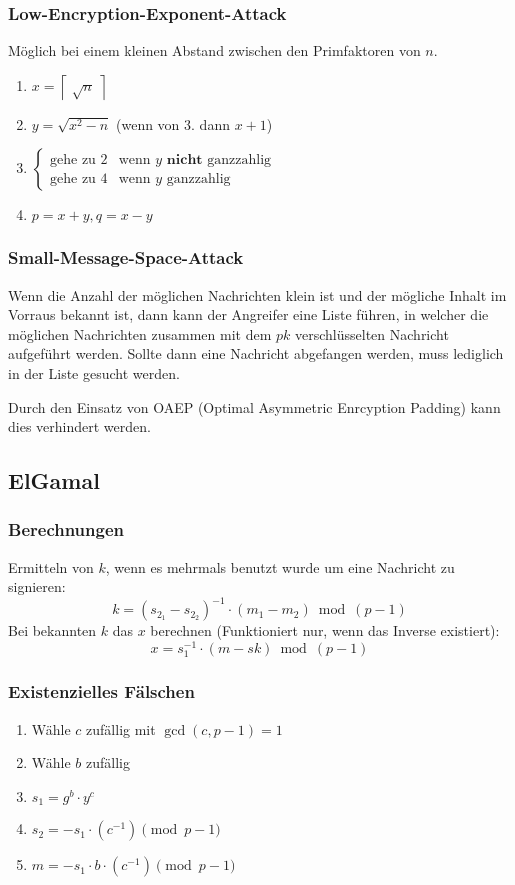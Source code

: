 \documentclass[a4paper,landscape]{article}
\newcommand{\plaint}{\ensuremath{m}}
\newcommand{\skey}{\ensuremath{sk}}
\newcommand{\pkey}{\ensuremath{pk}}
\begin{document}
\begin{multicols*}{4}
	\subsubsection*{Low-Encryption-Exponent-Attack}
	Möglich bei einem kleinen Abstand zwischen den Primfaktoren von \(n\).
	\begin{enumerate}
		\item \(x = \left\lceil\;\sqrt{n}\;\right\rceil\)
		\item \(y = \sqrt{x^{2}-n}\) (wenn von 3. dann \(x+1\))
		\item \(
		      \begin{cases}
			      \text{gehe zu 2} & \text{wenn } y \textbf{ nicht}\text{ ganzzahlig} \\
			      \text{gehe zu 4} & \text{wenn } y \text{ ganzzahlig}
		      \end{cases}\)
		\item \(p = x+y, q = x-y\)
	\end{enumerate}

	\subsubsection*{Small-Message-Space-Attack}
	Wenn die Anzahl der möglichen Nachrichten klein ist und der mögliche Inhalt
	im Vorraus bekannt ist, dann kann der Angreifer eine Liste führen, in welcher
	die möglichen Nachrichten zusammen mit dem \pkey\; verschlüsselten Nachricht
	aufgeführt werden. Sollte dann eine Nachricht abgefangen werden, muss lediglich
	in der Liste gesucht werden. \par
	Durch den Einsatz von OAEP (Optimal Asymmetric Enrcyption Padding) kann dies
	verhindert werden.

	\subsection{ElGamal}
	\subsubsection*{Berechnungen}
	Ermitteln von \(k\), wenn es mehrmals benutzt wurde um eine Nachricht zu
	signieren:
	\[k = (s_{2_1} - s_{2_2})^{-1} \cdot (\plaint_{1} - \plaint_{2}) \bmod (p-1)\]
	Bei bekannten \(k\) das \(x\) berechnen (Funktioniert nur, wenn das Inverse
	existiert):
	\[x = s_{1}^{-1} \cdot (\plaint - \skey) \bmod (p-1)\]

	\subsubsection*{Existenzielles Fälschen}
	\begin{enumerate}
		\item Wähle \(c\) zufällig mit \(\gcd(c,p-1) = 1\)
		\item Wähle \(b\) zufällig
		\item \(s_{1} = g^{b} \cdot y^{c}\)
		\item \(s_{2} = -s_{1} \cdot (c^{-1}) \pmod{p-1}\)
		\item \(m = -s_{1} \cdot b \cdot (c^{-1}) \pmod{p-1}\)
	\end{enumerate}


\end{multicols*}
\end{document}
